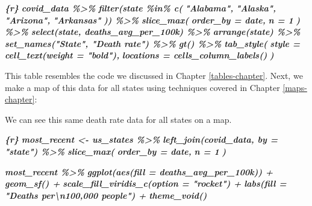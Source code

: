 \documentclass[
]{book}
\newenvironment{Shaded}{\begin{snugshade}}{\end{snugshade}}
\newcommand{\InformationTok}[1]{\textcolor[rgb]{0.56,0.35,0.01}{\textbf{\textit{#1}}}}
\newcommand{\NormalTok}[1]{#1}
\begin{document}
\begin{Shaded}
\begin{Highlighting}[]
\InformationTok{\textasciigrave{}\textasciigrave{}\textasciigrave{}\{r\}}
\InformationTok{covid\_data \%\textgreater{}\%}
\InformationTok{  filter(state \%in\% c(}
\InformationTok{    "Alabama",}
\InformationTok{    "Alaska",}
\InformationTok{    "Arizona",}
\InformationTok{    "Arkansas"}
\InformationTok{  )) \%\textgreater{}\%}
\InformationTok{  slice\_max(}
\InformationTok{    order\_by = date,}
\InformationTok{    n = 1}
\InformationTok{  ) \%\textgreater{}\%}
\InformationTok{  select(state, deaths\_avg\_per\_100k) \%\textgreater{}\%}
\InformationTok{  arrange(state) \%\textgreater{}\%}
\InformationTok{  set\_names("State", "Death rate") \%\textgreater{}\%}
\InformationTok{  gt() \%\textgreater{}\%}
\InformationTok{  tab\_style(}
\InformationTok{    style = cell\_text(weight = "bold"),}
\InformationTok{    locations = cells\_column\_labels()}
\InformationTok{  )}
\InformationTok{\textasciigrave{}\textasciigrave{}\textasciigrave{}}
\end{Highlighting}
\end{Shaded}

This table resembles the code we discussed in Chapter \ref{tables-chapter}. Next, we make a map of this data for all states using techniques covered in Chapter \ref{maps-chapter}:

\begin{Shaded}
\begin{Highlighting}[]
\NormalTok{We can see this same death rate data for all states on a map.}

\InformationTok{\textasciigrave{}\textasciigrave{}\textasciigrave{}\{r\}}
\InformationTok{most\_recent \textless{}{-} us\_states \%\textgreater{}\%}
\InformationTok{  left\_join(covid\_data, by = "state") \%\textgreater{}\%}
\InformationTok{  slice\_max(}
\InformationTok{    order\_by = date,}
\InformationTok{    n = 1}
\InformationTok{  )}

\InformationTok{most\_recent \%\textgreater{}\%}
\InformationTok{  ggplot(aes(fill = deaths\_avg\_per\_100k)) +}
\InformationTok{  geom\_sf() +}
\InformationTok{  scale\_fill\_viridis\_c(option = "rocket") +}
\InformationTok{  labs(fill = "Deaths per\textbackslash{}n100,000 people") +}
\InformationTok{  theme\_void()}
\InformationTok{\textasciigrave{}\textasciigrave{}\textasciigrave{}}
\end{Highlighting}
\end{Shaded}
\end{document}
